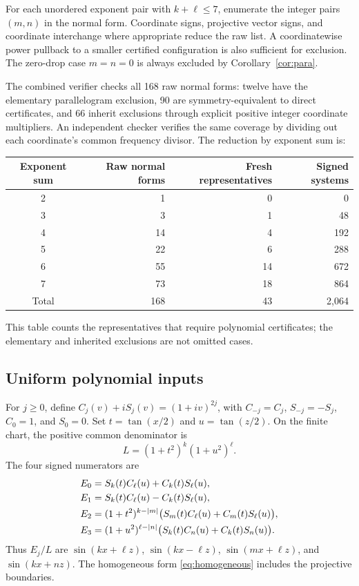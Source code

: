 \documentclass[11pt,letterpaper]{article}
\theoremstyle{definition}\newtheorem{definition}[theorem]{Definition}
\theoremstyle{remark}\newtheorem{remark}[theorem]{Remark}
\begin{document}
For each unordered exponent pair with $k+\ell\le7$, enumerate the integer pairs $(m,n)$ in the normal form. Coordinate signs, projective vector signs, and coordinate interchange where appropriate reduce the raw list. A coordinatewise power pullback to a smaller certified configuration is also sufficient for exclusion. The zero-drop case $m=n=0$ is always excluded by Corollary~\ref{cor:para}.

The combined verifier checks all 168 raw normal forms: twelve have the elementary parallelogram exclusion, 90 are symmetry-equivalent to direct certificates, and 66 inherit exclusions through explicit positive integer coordinate multipliers. An independent checker verifies the same coverage by dividing out each coordinate's common frequency divisor. The reduction by exponent sum is:
\begin{center}
\begin{tabular}{crrr}
\toprule
Exponent sum & Raw normal forms & Fresh representatives & Signed systems\\
\midrule
2 & 1 & 0 & 0\\
3 & 3 & 1 & 48\\
4 & 14 & 4 & 192\\
5 & 22 & 6 & 288\\
6 & 55 & 14 & 672\\
7 & 73 & 18 & 864\\
\midrule
Total & 168 & 43 & 2,064\\
\bottomrule
\end{tabular}
\end{center}
This table counts the representatives that require polynomial certificates; the elementary and inherited exclusions are not omitted cases.

\subsection{Uniform polynomial inputs}
For $j\ge0$, define $C_j(v)+iS_j(v)=(1+iv)^{2j}$, with $C_{-j}=C_j$, $S_{-j}=-S_j$, $C_0=1$, and $S_0=0$. Set $t=\tan(x/2)$ and $u=\tan(z/2)$. On the finite chart, the positive common denominator is
\[
L=(1+t^2)^k(1+u^2)^\ell.
\]
The four signed numerators are
\begin{align}
E_0&=S_k(t)C_\ell(u)+C_k(t)S_\ell(u),\notag\\
E_1&=S_k(t)C_\ell(u)-C_k(t)S_\ell(u),\notag\\
E_2&=(1+t^2)^{k-|m|}\bigl(S_m(t)C_\ell(u)+C_m(t)S_\ell(u)\bigr),\label{eq:twoinputs}\\
E_3&=(1+u^2)^{\ell-|n|}\bigl(S_k(t)C_n(u)+C_k(t)S_n(u)\bigr).\notag
\end{align}
Thus $E_j/L$ are $\sin(kx+\ell z)$, $\sin(kx-\ell z)$, $\sin(mx+\ell z)$, and $\sin(kx+nz)$. The homogeneous form \eqref{eq:homogeneous} includes the projective boundaries.
\end{document}
